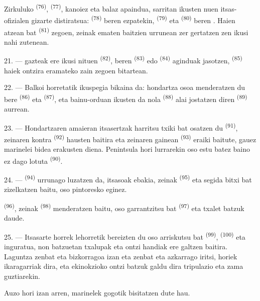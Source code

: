 Zirkuluko  \textsuperscript{(76)}, 
\textsuperscript{(77)}, kanoiez eta balaz apaindua, sarritan ikusten nuen
itsas-ofizialen gizarte distiratsua: 
\textsuperscript{(78)} beren ezpatekin, 
\textsuperscript{(79)} eta  \textsuperscript{(80)}
 beren . Haien atzean  bat
\textsuperscript{(81)} zegoen, zeinak  ematen baitzien
urrunean zer gertatzen zen ikusi nahi zutenean.

21. ---  gazteak ere ikusi nituen
\textsuperscript{(82)}, beren 
\textsuperscript{(83)} edo  \textsuperscript{(84)}
aginduak jasotzen,  \textsuperscript{(85)} haiek ontzira
eramateko zain zegoen bitartean.

22. --- Balkoi horretatik ikuspegia bikaina da: hondartza osoa menderatzen du
bere  \textsuperscript{(86)} eta 
\textsuperscript{(87)}, eta bainu-orduan ikusten da nola 
\textsuperscript{(88)} alai jostatzen diren 
\textsuperscript{(89)} aurrean.

23. --- Hondartzaren amaieran itsasertzak  harritsu txiki bat
osatzen du \textsuperscript{(91)}, zeinaren kontra 
\textsuperscript{(92)} hausten baitira eta zeinaren gainean 
\textsuperscript{(93)} eraiki baitute, gauez marinelei bidea erakusten diena.
Penintsula hori lurrarekin oso  estu batez baino ez dago lotuta
\textsuperscript{(90)}.

\VUsaut{3.0mm}
\VUsaut{3.0mm}

24. ---  \textsuperscript{(94)} urrunago luzatzen da,
itsasoak ebakia, zeinak  \textsuperscript{(95)} eta
 segida bitxi bat zizelkatzen baitu, oso pintoresko eginez.

 \textsuperscript{(96)}, zeinak 
\textsuperscript{(98)} menderatzen baitu, oso 
garrantzitsu bat \textsuperscript{(97)} eta txalet batzuk daude.

25. --- Itsasarte horrek lehorretik bereizten du oso 
arriskutsu bat \textsuperscript{(99)},  \textsuperscript{(100)}
eta  inguratua, non batzuetan txalupak eta ontzi handiak ere
galtzen baitira. Laguntza zenbat eta bizkorragoa izan eta 
zenbat eta azkarrago iritsi,  horiek ikaragarriak dira, eta
ekinokzioko  ontzi batzuk galdu dira tripulazio eta zama
guztiarekin.

Auzo hori izan arren, marinelek gogotik bisitatzen dute  hau.
\VUsaut{6.0mm}
\VUfilet{22mm}
